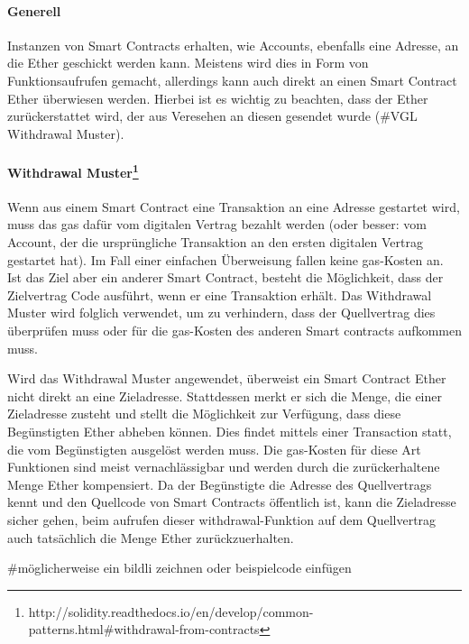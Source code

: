 \paragraph{Generell}
Instanzen von Smart Contracts erhalten, wie Accounts, ebenfalls eine Adresse, an die Ether geschickt werden kann. Meistens wird dies in Form von Funktionsaufrufen gemacht, allerdings kann auch direkt an einen Smart Contract Ether überwiesen werden. Hierbei ist es wichtig zu beachten, dass der Ether zurückerstattet wird, der aus Veresehen an diesen gesendet wurde (\#VGL Withdrawal Muster).

\paragraph{Withdrawal Muster\footnote{http://solidity.readthedocs.io/en/develop/common-patterns.html\#withdrawal-from-contracts}}
Wenn aus einem Smart Contract eine Transaktion an eine Adresse gestartet wird, muss das gas dafür vom digitalen Vertrag bezahlt werden (oder besser: vom Account, der die ursprüngliche Transaktion an den ersten digitalen Vertrag gestartet hat). Im Fall einer einfachen Überweisung fallen keine gas-Kosten an. Ist das Ziel aber ein anderer Smart Contract, besteht die Möglichkeit, dass der Zielvertrag Code ausführt, wenn er eine Transaktion erhält. Das Withdrawal Muster wird folglich verwendet, um zu verhindern, dass der Quellvertrag dies überprüfen muss oder für die gas-Kosten des anderen Smart contracts aufkommen muss.

Wird das Withdrawal Muster angewendet, überweist ein Smart Contract Ether nicht direkt an eine Zieladresse. Stattdessen merkt er sich die Menge, die einer Zieladresse zusteht und stellt die Möglichkeit zur Verfügung, dass diese Begünstigten Ether abheben können. Dies findet mittels einer Transaction statt, die vom Begünstigten ausgelöst werden muss. Die gas-Kosten für diese Art Funktionen sind meist vernachlässigbar und werden durch die zurückerhaltene Menge Ether kompensiert. Da der Begünstigte die Adresse des Quellvertrags kennt und den Quellcode von Smart Contracts öffentlich ist, kann die Zieladresse sicher gehen, beim aufrufen dieser withdrawal-Funktion auf dem Quellvertrag auch tatsächlich die Menge Ether zurückzuerhalten.


\#möglicherweise ein bildli zeichnen oder beispielcode einfügen


